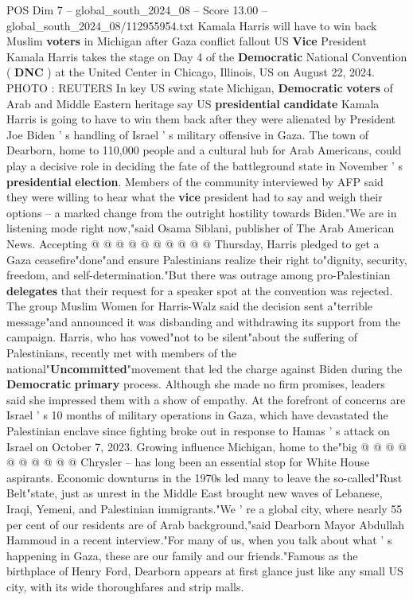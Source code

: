 \begin{textsample}{POS Dim 7 – global\_south\_2024\_08 – Score 13.00 – global\_south\_2024\_08/112955954.txt}  \label{ex:f7_pos_179}
Kamala Harris will have to win back Muslim \textbf{voters} in Michigan after Gaza conflict fallout US \textbf{Vice} President Kamala Harris takes the stage on Day 4 of the \textbf{Democratic} National Convention ( \textbf{DNC} ) at the United Center in Chicago, Illinois, US on August 22, 2024.
PHOTO : REUTERS In key US swing state Michigan, \textbf{Democratic} \textbf{voters} of Arab and Middle Eastern heritage say US \textbf{presidential} \textbf{candidate} Kamala Harris is going to have to win them back after they were alienated by President Joe Biden ' s handling of Israel ' s military offensive in Gaza.
The town of Dearborn, home to 110,000 people and a cultural hub for Arab Americans, could play a decisive role in deciding the fate of the battleground state in November ' s \textbf{presidential} \textbf{election}.
Members of the community interviewed by AFP said they were willing to hear what the \textbf{vice} president had to say and weigh their options -- a marked change from the outright hostility towards Biden."We are in listening mode right now,"said Osama Siblani, publisher of The Arab American News.
Accepting @ @ @ @ @ @ @ @ @ @ Thursday, Harris pledged to get a Gaza ceasefire"done"and ensure Palestinians realize their right to"dignity, security, freedom, and self-determination."But there was outrage among pro-Palestinian \textbf{delegates} that their request for a speaker spot at the convention was rejected.
The group Muslim Women for Harris-Walz said the decision sent a"terrible message"and announced it was disbanding and withdrawing its support from the campaign.
Harris, who has vowed"not to be silent"about the suffering of Palestinians, recently met with members of the national"\textbf{Uncommitted}"movement that led the charge against Biden during the \textbf{Democratic} \textbf{primary} process.
Although she made no firm promises, leaders said she impressed them with a show of empathy.
At the forefront of concerns are Israel ' s 10 months of military operations in Gaza, which have devastated the Palestinian enclave since fighting broke out in response to Hamas ' s attack on Israel on October 7, 2023.
Growing influence Michigan, home to the"big @ @ @ @ @ @ @ @ @ @ Chrysler -- has long been an essential stop for White House aspirants.
Economic downturns in the 1970s led many to leave the so-called"Rust Belt"state, just as unrest in the Middle East brought new waves of Lebanese, Iraqi, Yemeni, and Palestinian immigrants."We ' re a global city, where nearly 55 per cent of our residents are of Arab background,"said Dearborn Mayor Abdullah Hammoud in a recent interview."For many of us, when you talk about what ' s happening in Gaza, these are our family and our friends."Famous as the birthplace of Henry Ford, Dearborn appears at first glance just like any small US city, with its wide thoroughfares and strip malls.

\end{textsample}
